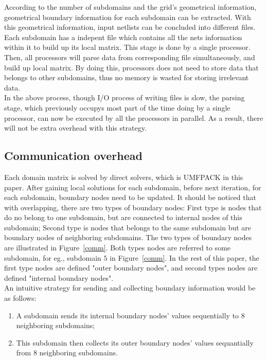 \documentclass{sig-alternate}
\begin{document}
	According to the number of subdomains and the grid's geometrical information, geometrical boundary information for each
	subdomain can be extracted. With this geometrical information, input netlists can be concluded into different files.
	Each subdomain has a indepent file which contains all the nets information within it to build up its local matrix. 
	This stage is done by a single processor. Then, all processors will parse data from corresponding file simultaneously, and build 
	up local matrix. By doing this, processors does not need to store data that belongs to other subdomains, thus no memory is 
	wasted for storing irrelevant data. \\

	In the above process, though I/O process of writing files is slow, the parsing stage, which previously occupys most part of the 
	time doing by a single processor, can now be executed by all the processors in parallel. As a result, there will not be extra
	overhead with this strategy.\\
	 
     \subsection{Communication overhead}
	Each domain matrix is solved by direct solvers, which is UMFPACK in this paper. After gaining local solutions for each subdomain, 
	before next iteration, for each subdomain, boundary nodes need to be updated. It should be noticed that with overlapping, there
	are two types of boundary nodes: First type is nodes that do no belong to one subdomain, but are connected to internal nodes of 
	this subdomain; Second type is nodes that belongs to the same subdomain but are boundary nodes of neighboring subdomains. The 
	two types of boundary nodes are illustrated in Figure~\ref{comm}. Both types nodes are referred to some subdomain, for eg., 
	subdomain $5$ in Figure~\ref{comm}. In the rest of this paper, the first type nodes are defined
	"outer boundary nodes", and second types nodes are defined "internal boundary nodes".\\ 

	An intuitive strategy for sending and collecting boundary information would be as follows:

	\begin{enumerate}[1.]
	  \item A subdomain sends its internal boundary nodes' values sequentially to 8 neighboring subdomains;
	  \item This subdomain then collects its outer boundary nodes' values sequantially from 8 neighboring subdomains.
	\end{enumerate}	
\end{document}
